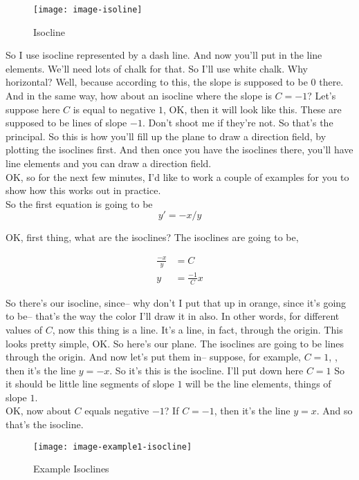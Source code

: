 \begin{figure}[ht!]
  \centering
  \texttt{[image: image-isoline]}
  \caption{Isocline}
\end{figure}

So I use isocline represented by a dash line.
And now you'll put in the line elements.
We'll need lots of chalk for that.
So I'll use white chalk. Why horizontal?
Well, because according to this, the slope
is supposed to be $0$ there.
And in the same way, how about an isocline
where the slope is $C = -1$?
Let's suppose here $C$ is equal to negative $1$, OK,
then it will look like this.
These are supposed to be lines of slope $-1$.
Don't shoot me if they're not.
So that's the principal.
So this is how you'll fill up the plane
to draw a direction field, by plotting the isoclines first.
And then once you have the isoclines there,
you'll have line elements and you can draw a direction field. \\


OK, so for the next few minutes, I'd like to work a couple of examples for you
to show how this works out in practice.\\

So the first equation is going to be
\begin{equation*}
  y' = -x/y
\end{equation*}

OK, first thing, what are the isoclines?
The isoclines are going to be,

\begin{align*}
  \frac{-x}{y} &= C \\
  y &= \frac{-1}{C} x
\end{align*}

So there's our isocline, since-- why don't I put that up
in orange, since it's going to be--
that's the way the color I'll draw it in also.
In other words, for different values of $C$,
now this thing is a line.
It's a line, in fact, through the origin.
This looks pretty simple, OK.
So here's our plane.
The isoclines are going to be lines through the origin.
And now let's put them in-- suppose, for example, $C = 1$,  
, then it's the line $y = - x$.
So it's this is the isocline. I'll put down here $C = 1$
So it should be little line segments of slope $1$ will be the line elements, things of slope $1$. \\
OK, now about $C$ equals negative $-1$?
If $C = -1$, then it's the line $y = x$.
And so that's the isocline.

\begin{figure}[ht!]
  \centering
  \texttt{[image: image-example1-isocline]}
  \caption{Example Isoclines}
\end{figure}

